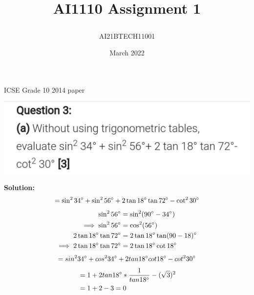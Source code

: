 \documentclass[journal,12pt,twocolumn]{IEEEtran}
\title{\textbf{AI1110 Assignment 1}
\author{AI21BTECH11001 }}
\date{March 2022}
\begin{document}
\maketitle
\begin{center}
{ICSE Grade 10 2014 paper}\end{center}

\includegraphics[scale=0.22]{main.jpeg}

\textbf{Solution:}
\begin{align}
= \sin^2 34\degree+ \sin^2 56\degree+2\tan 18\degree \tan 72\degree - \cot^2 30\degree
\end{align}
\begin{align}
 \sin^2 56\degree &= \sin^2 (90\degree - 34\degree)\\
  \implies \sin^2 56\degree &= \cos^2 (56\degree)\\
  \newline
  2\tan18\degree\tan72\degree &= 2\tan18\degree\tan(90 - 18)\degree\\
  \implies 2\tan18\degree\tan72\degree &= 2\tan18\degree\cot18\degree
 \end{align}
 \begin{align}
= sin^2 34\degree +cos^2 34\degree +2tan18\degree cot18\degree - cot^2 30\degree \end{align}
\begin{align}
&= 1 + 2tan18\degree*\frac{1}{tan18\degree} - (\sqrt{3})^2\\
&= 1 + 2 - 3
 = 0\end{align}
\end{document}
